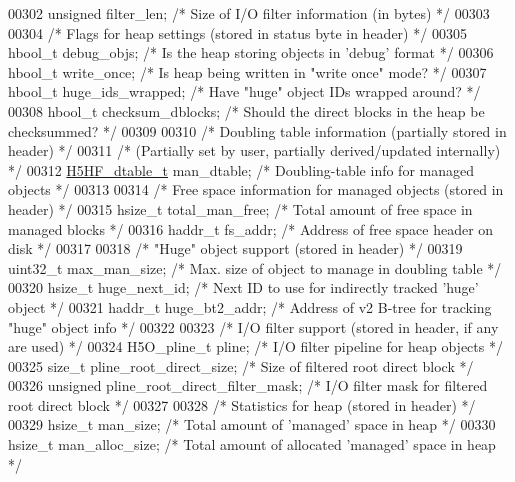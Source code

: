 \begin{DoxyCode}
00302     \textcolor{keywordtype}{unsigned}    filter\_len;     \textcolor{comment}{/* Size of I/O filter information (in bytes) */}
00303 
00304     \textcolor{comment}{/* Flags for heap settings (stored in status byte in header) */}
00305     hbool\_t     debug\_objs;     \textcolor{comment}{/* Is the heap storing objects in 'debug' format */}
00306     hbool\_t     write\_once;     \textcolor{comment}{/* Is heap being written in "write once" mode? */}
00307     hbool\_t     huge\_ids\_wrapped; \textcolor{comment}{/* Have "huge" object IDs wrapped around? */}
00308     hbool\_t     checksum\_dblocks; \textcolor{comment}{/* Should the direct blocks in the heap be checksummed? */}
00309 
00310     \textcolor{comment}{/* Doubling table information (partially stored in header) */}
00311     \textcolor{comment}{/* (Partially set by user, partially derived/updated internally) */}
00312     \hyperlink{struct_h5_h_f__dtable__t}{H5HF\_dtable\_t} man\_dtable;   \textcolor{comment}{/* Doubling-table info for managed objects */}
00313 
00314     \textcolor{comment}{/* Free space information for managed objects (stored in header) */}
00315     hsize\_t     total\_man\_free; \textcolor{comment}{/* Total amount of free space in managed blocks */}
00316     haddr\_t     fs\_addr;        \textcolor{comment}{/* Address of free space header on disk */}
00317 
00318     \textcolor{comment}{/* "Huge" object support (stored in header) */}
00319     uint32\_t    max\_man\_size;   \textcolor{comment}{/* Max. size of object to manage in doubling table */}
00320     hsize\_t     huge\_next\_id;   \textcolor{comment}{/* Next ID to use for indirectly tracked 'huge' object */}
00321     haddr\_t     huge\_bt2\_addr;  \textcolor{comment}{/* Address of v2 B-tree for tracking "huge" object info */}
00322 
00323     \textcolor{comment}{/* I/O filter support (stored in header, if any are used) */}
00324     H5O\_pline\_t pline;          \textcolor{comment}{/* I/O filter pipeline for heap objects */}
00325     \textcolor{keywordtype}{size\_t}      pline\_root\_direct\_size;    \textcolor{comment}{/* Size of filtered root direct block */}
00326     \textcolor{keywordtype}{unsigned}    pline\_root\_direct\_filter\_mask; \textcolor{comment}{/* I/O filter mask for filtered root direct block */}
00327 
00328     \textcolor{comment}{/* Statistics for heap (stored in header) */}
00329     hsize\_t     man\_size;       \textcolor{comment}{/* Total amount of 'managed' space in heap */}
00330     hsize\_t     man\_alloc\_size; \textcolor{comment}{/* Total amount of allocated 'managed' space in heap */}

\end{DoxyCode}

